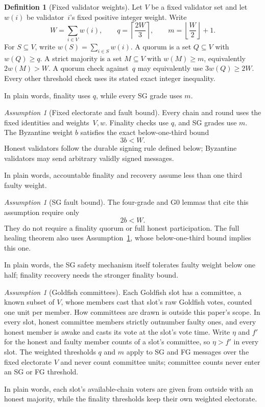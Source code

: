 \ifx\litemode\undefined\documentclass{article}\fi
\theoremstyle{plain}
\theoremstyle{definition}
\newtheorem{definition}{Definition}
\theoremstyle{remark}
\newtheorem{assumption}[theorem]{Assumption}
\begin{document}
\begin{definition}[Fixed validator weights]\label{def:validator-weights}
Let \(V\) be a fixed validator set and let \(w(i)\) be validator~\(i\)'s
fixed positive integer weight.  Write
\[
  W=\sum_{i\in V}w(i),
  \qquad
  q=\left\lceil\frac{2W}{3}\right\rceil,
  \qquad
  m=\left\lfloor\frac W2\right\rfloor+1.
\]
For \(S\subseteq V\), write \(w(S)=\sum_{i\in S}w(i)\).  A quorum is a set
\(Q\subseteq V\) with \(w(Q)\geq q\).
A strict majority is a set \(M\subseteq V\) with \(w(M)\geq m\), equivalently
\(2w(M)>W\).
A quorum check against~\(q\) may equivalently use
\(3w(Q)\geq2W\).  Every other threshold check uses its stated exact integer
inequality.

In plain words, finality uses \(q\), while every SG grade uses \(m\).
\end{definition}

\begin{assumption}[Fixed electorate and fault bound]\label{ass:fixed-electorate}
Every chain and round uses the fixed identities and weights~\(V,w\).
Finality checks use \(q\), and SG grades use \(m\).  The Byzantine weight \(b\)
satisfies the exact below-one-third bound
\[
  3b<W.
\]
Honest validators follow the durable signing rule defined below; Byzantine
validators may send arbitrary validly signed messages.

In plain words, accountable finality and recovery assume less than one third
faulty weight.
\end{assumption}

\begin{assumption}[SG fault bound]\label{ass:sg-fault-bound}
The four-grade and G0 lemmas that cite this assumption require only
\[
  2b<W.
\]
They do not require a finality quorum or full honest participation.  The full
healing theorem also uses Assumption~\ref{ass:fixed-electorate}, whose
below-one-third bound implies this one.

In plain words, the SG safety mechanism itself tolerates faulty weight below
one half; finality recovery needs the stronger finality bound.
\end{assumption}

\begin{assumption}[Goldfish committees]\label{ass:goldfish-committees}
Each Goldfish slot has a committee, a known subset of \(V\), whose members
cast that slot's raw Goldfish votes, counted one unit per member.  How
committees are drawn is outside this paper's scope.  In every slot, honest
committee members strictly outnumber faulty ones, and every honest member
is awake and casts its vote at the slot's vote time.  Write \(\eta\) and
\(f'\) for the honest and faulty member counts of a slot's committee, so
\(\eta>f'\) in every slot.  The weighted
thresholds \(q\) and \(m\) apply to SG and FG messages over the fixed
electorate \(V\) and never count committee units; committee counts never
enter an SG or FG threshold.

In plain words, each slot's available-chain voters are given from outside
with an honest majority, while the finality thresholds keep their own
weighted electorate.
\end{assumption}
\end{document}
